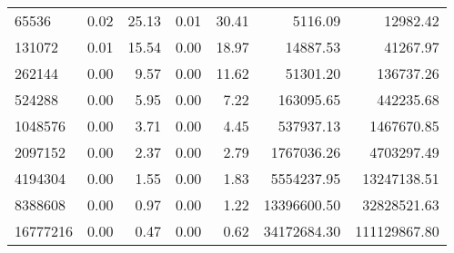 \begin{tabular}{lrrrrrr}
65536    &        0.02 &         25.13 &           0.01 &        30.41 &          5116.09 &        12982.42 \\
131072   &        0.01 &         15.54 &           0.00 &        18.97 &         14887.53 &        41267.97 \\
262144   &        0.00 &          9.57 &           0.00 &        11.62 &         51301.20 &       136737.26 \\
524288   &        0.00 &          5.95 &           0.00 &         7.22 &        163095.65 &       442235.68 \\
1048576  &        0.00 &          3.71 &           0.00 &         4.45 &        537937.13 &      1467670.85 \\
2097152  &        0.00 &          2.37 &           0.00 &         2.79 &       1767036.26 &      4703297.49 \\
4194304  &        0.00 &          1.55 &           0.00 &         1.83 &       5554237.95 &     13247138.51 \\
8388608  &        0.00 &          0.97 &           0.00 &         1.22 &      13396600.50 &     32828521.63 \\
16777216 &        0.00 &          0.47 &           0.00 &         0.62 &      34172684.30 &    111129867.80 \\
\bottomrule
\end{tabular}

